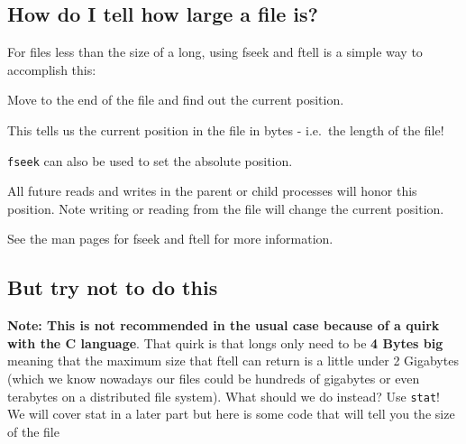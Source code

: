 \subsection{How do I tell how large a file
is?}\label{how-do-i-tell-how-large-a-file-is}

For files less than the size of a long, using fseek and ftell is a
simple way to accomplish this:

Move to the end of the file and find out the current position.

\begin{Shaded}
\begin{Highlighting}[]
 
\end{Highlighting}
\end{Shaded}

This tells us the current position in the file in bytes - i.e.~the
length of the file!

\texttt{fseek} can also be used to set the absolute position.

\begin{Shaded}
\begin{Highlighting}[]
\end{Highlighting}
\end{Shaded}

All future reads and writes in the parent or child processes will honor
this position. Note writing or reading from the file will change the
current position.

See the man pages for fseek and ftell for more information.

\subsection{But try not to do this}\label{but-try-not-to-do-this}

\textbf{Note: This is not recommended in the usual case because of a
quirk with the C language}. That quirk is that longs only need to be
\textbf{4 Bytes big} meaning that the maximum size that ftell can return
is a little under 2 Gigabytes (which we know nowadays our files could be
hundreds of gigabytes or even terabytes on a distributed file system).
What should we do instead? Use \texttt{stat}! We will cover stat in a
later part but here is some code that will tell you the size of the file

